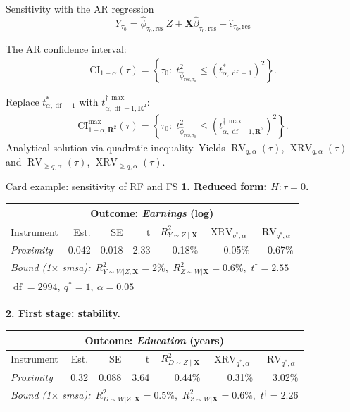 \documentclass[xcolor=dvipsnames]{beamer}
\newcommand{\mb}{\mathbf}
\newcommand{\X}{\ensuremath{\mb{X}}}
\newcommand{\R}{{\bm R}}
\DeclareMathOperator{\df}{df}
\DeclareMathOperator{\rv}{RV}
\DeclareMathOperator{\xrv}{XRV}
\begin{document}
\begin{frame}{Sensitivity with the AR regression}
\small
\[
Y_{\tau_0} = \hat{\phi}_{\tau_0, \text{res}}\, Z + \X\hat{\beta}_{\tau_0, \text{res}} + \hat{\epsilon}_{\tau_0, \text{res}}
\]

The AR confidence interval:
\begin{align*}
\text{CI}_{1-\alpha}(\tau) = \left\{\tau_0 :\; t^2_{\hat{\phi}_{\text{res}, \tau_0}} \leq (t^*_{\alpha, \df-1})^2\right\}.
\end{align*}

Replace $t^*_{\alpha, \df-1}$ with $t^{\dagger\,\max}_{\alpha, \df-1, \R^2}$:
\begin{align*}
\text{CI}^{\max}_{1-\alpha, \R^2}(\tau) = \left\{\tau_0 :\; t^2_{\hat{\phi}_{\text{res}, \tau_0}} \leq (t^{\dagger\,\max}_{\alpha, \df-1, \R^2})^2\right\}.
\end{align*}
\footnotesize
Analytical solution via quadratic inequality. Yields $\rv_{q,\alpha}(\tau)$, $\xrv_{q,\alpha}(\tau)$ and $\rv_{\geq q,\alpha}(\tau)$, $\xrv_{\geq q,\alpha}(\tau)$.
\end{frame}


\begin{frame}{Card example: sensitivity of RF and FS}
 \textbf{1. Reduced form: $H: \tau = 0$.}
\footnotesize
\begin{table}[!ht]
\centering
\begin{tabular}{lrrrrrr}
\multicolumn{7}{c}{Outcome: \textit{Earnings} (log)} \\
\hline\hline
Instrument & Est. & SE & t & $R^2_{Y\sim Z \mid \X}$ & $\xrv_{q^*,\alpha}$ & $\rv_{q^*,\alpha}$ \\
\hline
\textit{Proximity} & 0.042 & 0.018 & 2.33 & 0.18\% & 0.05\% & 0.67\% \\
\hline
\multicolumn{7}{l}{\small \textit{Bound (1$\times$ smsa):}\ $R^2_{Y\sim W|Z,\X} = 2\%$,\ $R^2_{Z\sim W|\X} = 0.6\%$,\ $t^\dagger = 2.55$}\\
\multicolumn{7}{l}{\small $\df = 2994,\ q^* = 1,\ \alpha = 0.05$}
\end{tabular}
\end{table}
\normalsize
\bigskip
{} \textbf{2. First stage: stability.}
\footnotesize
\begin{table}[!b]
\centering
\begin{tabular}{lrrrrrr}
\multicolumn{7}{c}{Outcome: \textit{Education} (years)} \\
\hline\hline
Instrument & Est. & SE & t & $R^2_{D\sim Z \mid \X}$ & $\xrv_{q^*,\alpha}$ & $\rv_{q^*,\alpha}$ \\
\hline
\textit{Proximity} & 0.32 & 0.088 & 3.64 & 0.44\% & 0.31\% & 3.02\% \\
\hline
\multicolumn{7}{l}{\small \textit{Bound (1$\times$ smsa):}\ $R^2_{D\sim W|Z,\X} = 0.5\%$,\ $R^2_{Z\sim W|\X} = 0.6\%$,\ $t^\dagger = 2.26$}
\end{tabular}
\end{table}
\end{frame}
\end{document}
